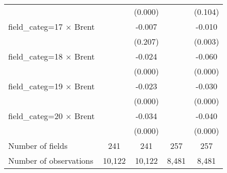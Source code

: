 \begin{tabular}{l*{4}{c}}
                                        &            &     (0.000)&            &     (0.104)\\
field_categ=17 $\times$ Brent           &            &      -0.007&            &      -0.010\\
                                        &            &     (0.207)&            &     (0.003)\\
field_categ=18 $\times$ Brent           &            &      -0.024&            &      -0.060\\
                                        &            &     (0.000)&            &     (0.000)\\
field_categ=19 $\times$ Brent           &            &      -0.023&            &      -0.030\\
                                        &            &     (0.000)&            &     (0.000)\\
field_categ=20 $\times$ Brent           &            &      -0.034&            &      -0.040\\
                                        &            &     (0.000)&            &     (0.000)\\
\hline
Number of fields                        &         241&         241&         257&         257\\
Number of observations                  &      10,122&      10,122&       8,481&       8,481\\
\hline\hline
\end{tabular}
